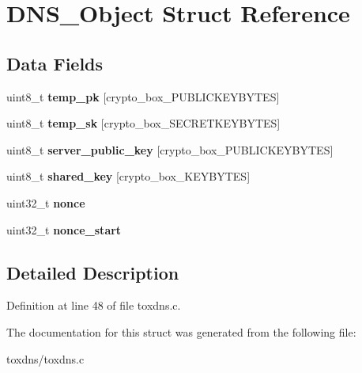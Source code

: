 \hypertarget{struct_d_n_s___object}{\section{D\+N\+S\+\_\+\+Object Struct Reference}
\label{struct_d_n_s___object}
}
\subsection*{Data Fields}
\begin{DoxyCompactItemize}
\item 
\hypertarget{struct_d_n_s___object_a46affbcc202b25e96fd1f5238e9e97e0}{uint8\+\_\+t {\bfseries temp\+\_\+pk} \mbox{[}crypto\+\_\+box\+\_\+\+P\+U\+B\+L\+I\+C\+K\+E\+Y\+B\+Y\+T\+E\+S\mbox{]}}\label{struct_d_n_s___object_a46affbcc202b25e96fd1f5238e9e97e0}

\item 
\hypertarget{struct_d_n_s___object_a3652189f09ee098ced277788337d95e7}{uint8\+\_\+t {\bfseries temp\+\_\+sk} \mbox{[}crypto\+\_\+box\+\_\+\+S\+E\+C\+R\+E\+T\+K\+E\+Y\+B\+Y\+T\+E\+S\mbox{]}}\label{struct_d_n_s___object_a3652189f09ee098ced277788337d95e7}

\item 
\hypertarget{struct_d_n_s___object_acc2e1517636c724d8778c873a4fce5e1}{uint8\+\_\+t {\bfseries server\+\_\+public\+\_\+key} \mbox{[}crypto\+\_\+box\+\_\+\+P\+U\+B\+L\+I\+C\+K\+E\+Y\+B\+Y\+T\+E\+S\mbox{]}}\label{struct_d_n_s___object_acc2e1517636c724d8778c873a4fce5e1}

\item 
\hypertarget{struct_d_n_s___object_a0f4a120c7bd84eb7beebe6c163ce5744}{uint8\+\_\+t {\bfseries shared\+\_\+key} \mbox{[}crypto\+\_\+box\+\_\+\+K\+E\+Y\+B\+Y\+T\+E\+S\mbox{]}}\label{struct_d_n_s___object_a0f4a120c7bd84eb7beebe6c163ce5744}

\item 
\hypertarget{struct_d_n_s___object_aa2f9785a9d9116cc4592db06375cb887}{uint32\+\_\+t {\bfseries nonce}}\label{struct_d_n_s___object_aa2f9785a9d9116cc4592db06375cb887}

\item 
\hypertarget{struct_d_n_s___object_a9bf0718fc917292d63aa2667d22c0502}{uint32\+\_\+t {\bfseries nonce\+\_\+start}}\label{struct_d_n_s___object_a9bf0718fc917292d63aa2667d22c0502}

\end{DoxyCompactItemize}


\subsection{Detailed Description}


Definition at line 48 of file toxdns.\+c.



The documentation for this struct was generated from the following file\+:\begin{DoxyCompactItemize}
\item 
toxdns/toxdns.\+c\end{DoxyCompactItemize}
